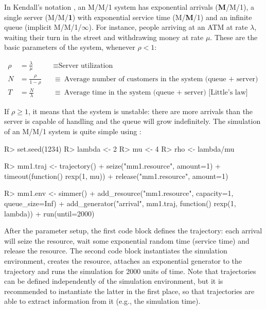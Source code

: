 \documentclass[
  nojss]{jss}
\begin{document}
In Kendall's notation \citep{Kendall:1953}, an M/M/1 system has
exponential arrivals (\textbf{M}/M/1), a single server (M/M/\textbf{1})
with exponential service time (M/\textbf{M}/1) and an infinite queue
(implicit M/M/1/\textbf{\(\infty\)}). For instance, people arriving at
an ATM at rate \(\lambda\), waiting their turn in the street and
withdrawing money at rate \(\mu\). These are the basic parameters of the
system, whenever \(\rho < 1\):

\begin{align}
\rho &= \frac{\lambda}{\mu} &&\equiv \mbox{Server utilization} \\
N &= \frac{\rho}{1-\rho} &&\equiv \mbox{Average number of customers in the system (queue $+$ server)} \label{eq:N}\\
T &= \frac{N}{\lambda} &&\equiv \mbox{Average time in the system (queue $+$ server) [Little's law]}
\end{align}

If \(\rho \ge 1\), it means that the system is unstable: there are more
arrivals than the server is capable of handling and the queue will grow
indefinitely. The simulation of an M/M/1 system is quite simple using
:

\begin{CodeChunk}
\begin{CodeInput}
R> set.seed(1234)
R> lambda <- 2
R> mu <- 4
R> rho <- lambda/mu
\end{CodeInput}
\end{CodeChunk}

\begin{CodeChunk}
\begin{CodeInput}
R> mm1.traj <- trajectory() %
+   seize("mm1.resource", amount=1) %
+   timeout(function() rexp(1, mu)) %
+   release("mm1.resource", amount=1)
\end{CodeInput}
\end{CodeChunk}

\begin{CodeChunk}
\begin{CodeInput}
R> mm1.env <- simmer() %
+   add_resource("mm1.resource", capacity=1, queue_size=Inf) %
+   add_generator("arrival", mm1.traj, function() rexp(1, lambda)) %
+   run(until=2000)
\end{CodeInput}
\end{CodeChunk}

After the parameter setup, the first code block defines the trajectory:
each arrival will seize the resource, wait some exponential random time
(service time) and release the resource. The second code block
instantiates the simulation environment, creates the resource, attaches
an exponential generator to the trajectory and runs the simulation for
2000 units of time. Note that trajectories can be defined independently
of the simulation environment, but it is recommended to instantiate the
latter in the first place, so that trajectories are able to extract
information from it (e.g., the simulation time).
\end{document}
